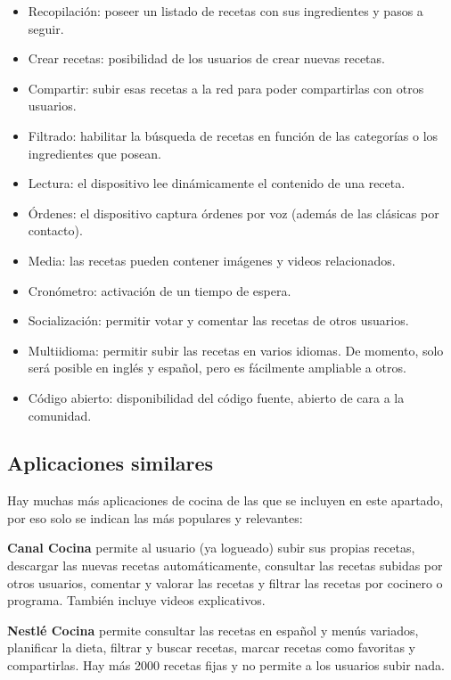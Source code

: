 \begin{itemize}
\item Recopilación: poseer un listado de recetas con sus ingredientes
  y pasos a seguir.
\item Crear recetas: posibilidad de los usuarios de crear nuevas recetas.
\item Compartir: subir esas recetas a la red para poder compartirlas con
  otros usuarios.
\item Filtrado: habilitar la búsqueda de recetas en función de
  las categorías o los ingredientes que posean.
\item Lectura: el dispositivo lee dinámicamente el contenido de una
  receta.
\item Órdenes: el dispositivo captura órdenes por voz (además de
  las clásicas por contacto).
\item Media: las recetas pueden contener imágenes y videos
  relacionados.
\item Cronómetro: activación de un tiempo de espera.
\item Socialización: permitir votar y comentar las recetas de otros usuarios.
\item Multiidioma: permitir subir las recetas en varios idiomas. De momento,
  solo será posible en inglés y español, pero es fácilmente ampliable a otros.
\item Código abierto: disponibilidad del código fuente, abierto de cara a la
  comunidad.
\end{itemize}

\subsection{Aplicaciones similares}

Hay muchas más aplicaciones de cocina de las que se incluyen en este apartado,
por eso solo se indican las más populares y relevantes:

\textbf{Canal Cocina} permite al usuario (ya logueado) subir sus propias
recetas, descargar las nuevas recetas automáticamente, consultar las recetas
subidas por otros usuarios, comentar y valorar las recetas y filtrar las
recetas por cocinero o programa. También incluye videos explicativos.

\textbf{Nestlé Cocina} permite consultar las recetas en español y menús variados,
planificar la dieta, filtrar y buscar recetas, marcar recetas como favoritas
y compartirlas. Hay más 2000 recetas fijas y no permite a los usuarios subir
nada.

